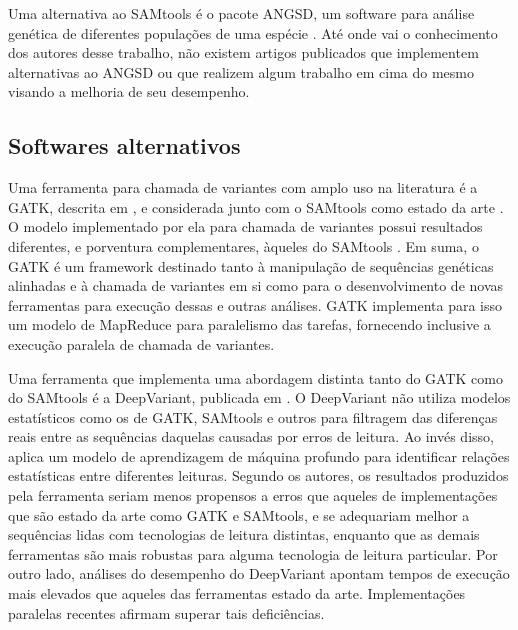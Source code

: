 \documentclass[cic,tc]{iiufrgs}
\begin{document}
Uma alternativa ao SAMtools é o pacote ANGSD, um software para análise genética
de diferentes populações de uma espécie \cite{korneliussen2014angsd}. Até onde
vai o conhecimento dos autores desse trabalho, não existem artigos publicados
que implementem alternativas ao ANGSD ou que realizem algum trabalho em cima do
mesmo visando a melhoria de seu desempenho.

\subsection{Softwares alternativos}
\label{sec:alt}

Uma ferramenta para chamada de variantes com amplo uso na literatura
\cite{de2017gatk} é a GATK, descrita em \cite{mckenna2010genome}, e considerada
junto com o SAMtools como estado da
arte \cite{yao2020evaluation} \cite{poplin2018universal}. O modelo implementado
por ela para chamada de variantes possui resultados diferentes, e porventura
complementares, àqueles do
SAMtools \cite{gezsi2015variantmetacaller} \cite{hwang2015systematic}. Em suma, o
GATK é um framework destinado tanto à manipulação de sequências genéticas
alinhadas e à chamada de variantes em si como para o desenvolvimento de novas
ferramentas para execução dessas e outras análises. GATK implementa para isso
um modelo de MapReduce para paralelismo das tarefas, fornecendo inclusive a
execução paralela de chamada de variantes.


Uma ferramenta que implementa uma abordagem distinta tanto do GATK como do
SAMtools é a DeepVariant, publicada em \cite{poplin2018universal}. O DeepVariant
não utiliza modelos estatísticos como os de GATK, SAMtools e outros para
filtragem das diferenças reais entre as sequências daquelas causadas por erros
de leitura. Ao invés disso, aplica um modelo de aprendizagem de máquina
profundo para identificar relações estatísticas entre diferentes leituras.
Segundo os autores, os resultados produzidos pela ferramenta seriam menos
propensos a erros que aqueles de implementações que são estado da arte como
GATK e SAMtools, e se adequariam melhor a sequências lidas com tecnologias de
leitura distintas, enquanto que as demais ferramentas são mais robustas para
alguma tecnologia de leitura particular. Por outro lado, análises do desempenho
do DeepVariant apontam tempos de execução mais elevados que aqueles das
ferramentas estado da arte. Implementações paralelas recentes afirmam superar
tais deficiências. \cite{ahmad2021vc}
\end{document}
